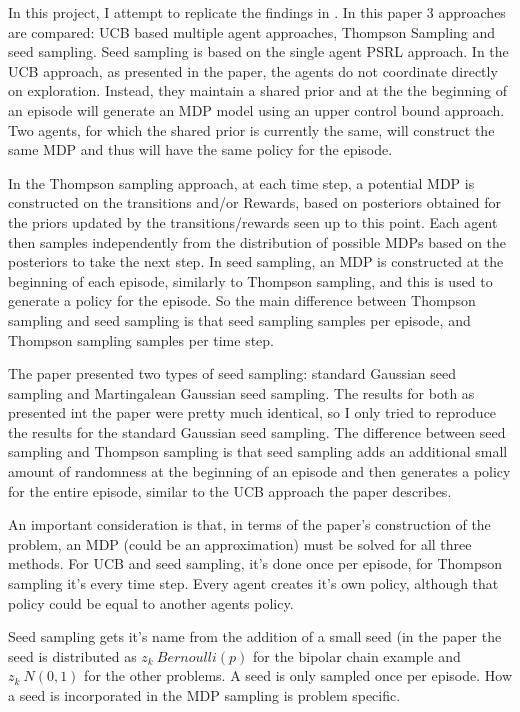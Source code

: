 \documentclass{article}
\begin{document}
In this project, I attempt to replicate the findings in \cite{SeedSampling}. In this paper 3 approaches are compared: UCB based multiple agent approaches, Thompson Sampling and seed sampling. Seed sampling is based on the single agent PSRL approach.  In the UCB approach, as presented in the paper, the agents do not coordinate directly on exploration. Instead, they maintain a shared prior  and at the the beginning of an episode will generate an MDP model using an upper control bound approach.  Two agents, for which the shared prior is currently the same, will construct the same MDP and thus will have the same policy for the episode.

In the Thompson sampling approach, at each time step, a potential MDP is constructed on the transitions and/or Rewards, based on posteriors obtained for the priors updated by the transitions/rewards seen up to this point. Each agent then samples independently from the distribution of possible MDPs based on the posteriors to take the next step. In seed sampling, an MDP is constructed at the beginning of each episode, similarly to Thompson sampling, and this is used to generate a policy for the episode. So the main difference between Thompson sampling and seed sampling is that seed sampling samples per episode, and Thompson sampling samples per time step.

The paper presented two types of seed sampling: standard Gaussian seed sampling and Martingalean Gaussian seed sampling. The results for both as presented int the paper were pretty much identical, so I only tried to reproduce the results for the standard Gaussian seed sampling. The difference between seed sampling and Thompson sampling is that seed sampling adds an additional small amount of randomness at the beginning of an episode and then generates a policy for the entire episode, similar to the UCB approach the paper describes.

An important consideration is that, in terms of the paper's construction of the problem, an MDP (could be an approximation) must be solved for all three methods. For UCB and seed sampling, it's done once per episode, for Thompson sampling it's every time step. Every agent creates it's own policy, although that policy could be equal to another agents policy.

Seed sampling gets it's name from the addition of a small seed (in the paper the seed is distributed as $z_k~ Bernoulli(p)$ for the bipolar chain example and $z_k ~ N(0,1)$ for the other problems.  A seed is only sampled once per episode. How a seed is incorporated in the MDP sampling is problem specific.
\end{document}
